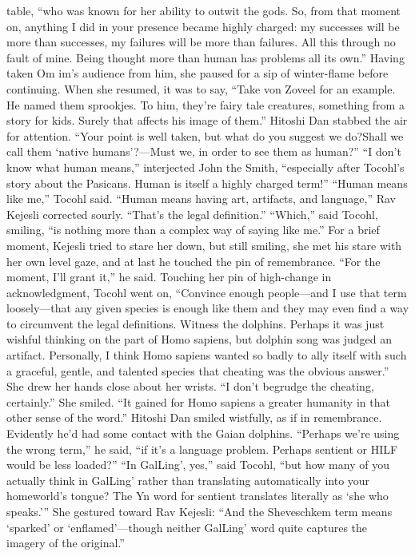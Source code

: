 \documentclass[9pt]{article}
\begin{document}
table, “who was known for her ability to outwit the gods. So, from that moment on, anything I did in your
presence became highly charged: my successes will be more than successes, my failures will be more
than failures. All this through no fault of mine. Being thought more than human has problems all its own.”
Having taken Om im’s audience from him, she paused for a sip of winter-flame before continuing.
When she resumed, it was to say, “Take von Zoveel for an example. He named them sprookjes. To him,
they’re fairy tale creatures, something from a story for kids. Surely that affects his image of them.”
Hitoshi Dan stabbed the air for attention. “Your point is well taken, but what do you suggest we do?Shall we call them ‘native humans’?—Must we, in order to see them as human?”
“I don’t know what human means,” interjected John the Smith, “especially after Tocohl’s story
about the Pasicans. Human is itself a highly charged term!”
“Human means like me,” Tocohl said.
“Human means having art, artifacts, and language,” Rav Kejesli corrected sourly. “That’s the legal
definition.”
“Which,” said Tocohl, smiling, “is nothing more than a complex way of saying like me.”
For a brief moment, Kejesli tried to stare her down, but still smiling, she met his stare with her own
level gaze, and at last he touched the pin of remembrance. “For the moment, I’ll grant it,” he said.
Touching her pin of high-change in acknowledgment, Tocohl went on, “Convince enough
people—and I use that term loosely—that any given species is enough like them and they may even find
a way to circumvent the legal definitions. Witness the dolphins. Perhaps it was just wishful thinking on the
part of Homo sapiens, but dolphin song was judged an artifact. Personally, I think Homo sapiens
wanted so badly to ally itself with such a graceful, gentle, and talented species that cheating was the
obvious answer.” She drew her hands close about her wrists.
“I don’t begrudge the cheating, certainly.” She smiled. “It gained for Homo sapiens a greater
humanity in that other sense of the word.”
Hitoshi Dan smiled wistfully, as if in remembrance. Evidently he’d had some contact with the Gaian
dolphins. “Perhaps we’re using the wrong term,” he said, “if it’s a language problem. Perhaps sentient or
HILF would be less loaded?”
“In GalLing’, yes,” said Tocohl, “but how many of you actually think in GalLing’ rather than
translating automatically into your homeworld’s tongue? The Yn word for sentient translates literally as
‘she who speaks.’” She gestured toward Rav Kejesli: “And the Sheveschkem term means ‘sparked’ or
‘enflamed’—though neither GalLing’ word quite captures the imagery of the original.”
\end{document}
